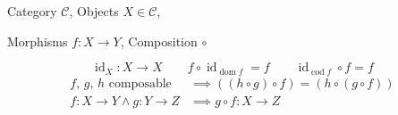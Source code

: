 \documentclass[11pt]{article}
\DeclareMathOperator{\dom}{\mathrm{dom}}
\DeclareMathOperator{\cod}{\mathrm{cod}}
\begin{document}
\newcommand{\C}{\mathcal{C}}
\newcommand{\id}[1]{\operatorname{id}_{#1}}
\thispagestyle{empty}
\begin{center}
Category $\C$, Objects $X\in\C$,
\end{center}
\vspace{-2em}
\begin{center}
Morphisms $f:X\to Y$, Composition $\circ$
\end{center}
\vspace{-0.5em}
\[\id{X}:X\to X\qquad f\circ\id{\dom{f}}=f\qquad\id{\cod{f}}\circ f=f\]
\vspace{-2.5em}
\begin{align*}
\text{$f$, $g$, $h$ composable}&\implies((h\circ g)\circ f)=(h\circ(g\circ f))\\[0.5mm]
f:X\to Y\land g:Y\to Z&\implies g\circ f:X\to Z
\end{align*}
\end{document}

